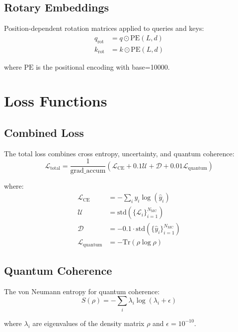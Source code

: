 \documentclass{article}
\begin{document}
\subsection{Rotary Embeddings}
Position-dependent rotation matrices applied to queries and keys:
\begin{equation}
\begin{split}
q_{\text{rot}} &= q \odot \text{PE}(L,d) \\
k_{\text{rot}} &= k \odot \text{PE}(L,d)
\end{split}
\end{equation}

where $\text{PE}$ is the positional encoding with base=10000.

\section{Loss Functions}

\subsection{Combined Loss}
The total loss combines cross entropy, uncertainty, and quantum coherence:
\begin{equation}
\mathcal{L}_{\text{total}} = \frac{1}{\text{grad\_accum}}\left(\mathcal{L}_{\text{CE}} + 0.1\mathcal{U} + \mathcal{D} + 0.01\mathcal{L}_{\text{quantum}}\right)
\end{equation}

where:
\begin{align*}
\mathcal{L}_{\text{CE}} &= -\sum_{i} y_i \log(\hat{y}_i) \\
\mathcal{U} &= \text{std}(\{\mathcal{L}_i\}_{i=1}^{N_{\text{MC}}}) \\
\mathcal{D} &= -0.1 \cdot \text{std}(\{\hat{y}_i\}_{i=1}^{N_{\text{MC}}}) \\
\mathcal{L}_{\text{quantum}} &= -\text{Tr}(\rho\log\rho)
\end{align*}

\subsection{Quantum Coherence}
The von Neumann entropy for quantum coherence:
\begin{equation}
S(\rho) = -\sum_i \lambda_i \log(\lambda_i + \epsilon)
\end{equation}

where $\lambda_i$ are eigenvalues of the density matrix $\rho$ and $\epsilon=10^{-10}$.
\end{document}
